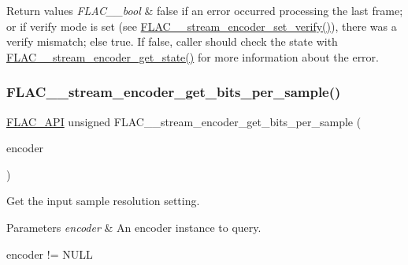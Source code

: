 \begin{DoxyRetVals}{Return values}
{\em F\+L\+A\+C\+\_\+\+\_\+bool} & {\ttfamily false} if an error occurred processing the last frame; or if verify mode is set (see \hyperlink{group__flac__stream__encoder_ga5f4ac18a7207d2864fed72d284486f9e}{F\+L\+A\+C\+\_\+\+\_\+stream\+\_\+encoder\+\_\+set\+\_\+verify()}), there was a verify mismatch; else {\ttfamily true}. If {\ttfamily false}, caller should check the state with \hyperlink{group__flac__stream__encoder_gaff7284e55f01b59ed8f03317df510992}{F\+L\+A\+C\+\_\+\+\_\+stream\+\_\+encoder\+\_\+get\+\_\+state()} for more information about the error. \\
\hline
\end{DoxyRetVals}
\mbox{\label{group__flac__stream__encoder_gacbd84a241c6718ed4c2688fd558efdcd}} 
\subsubsection{\texorpdfstring{F\+L\+A\+C\+\_\+\+\_\+stream\+\_\+encoder\+\_\+get\+\_\+bits\+\_\+per\+\_\+sample()}{FLAC\_\_stream\_encoder\_get\_bits\_per\_sample()}}
{\footnotesize\ttfamily \hyperlink{group__flac__export_ga56ca07df8a23310707732b1c0007d6f5}{F\+L\+A\+C\+\_\+\+A\+PI} unsigned F\+L\+A\+C\+\_\+\+\_\+stream\+\_\+encoder\+\_\+get\+\_\+bits\+\_\+per\+\_\+sample (\begin{DoxyParamCaption}\item[{\hyperlink{zconf_8h_a2c212835823e3c54a8ab6d95c652660e}{const} \hyperlink{struct_f_l_a_c_____stream_encoder}{F\+L\+A\+C\+\_\+\+\_\+\+Stream\+Encoder} $\ast$}]{encoder }\end{DoxyParamCaption})}

Get the input sample resolution setting.


\begin{DoxyParams}{Parameters}
{\em encoder} & An encoder instance to query.  
\begin{DoxyCode}
encoder != NULL 
\end{DoxyCode}
 \\
\hline
\end{DoxyParams}


